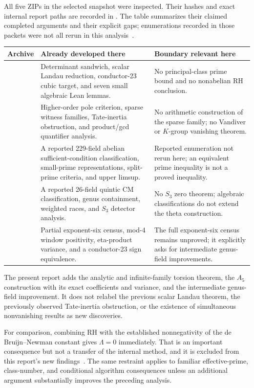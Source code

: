 All five ZIPs in the selected  snapshot were inspected.
Their hashes and exact internal report paths are recorded in
. The table summarizes their
claimed completed arguments and their explicit gaps; enumerations
recorded in those packets were not all rerun in this analysis~\cite{prior}.

\begin{center}
\footnotesize
\begin{tabularx}{\textwidth}{@{}p{49mm}YY@{}}
\toprule
Archive & Already developed there & Boundary relevant here\\
\midrule
{} &
Determinant sandwich, scalar Landau reduction, conductor-23 cubic target,
and seven small algebraic Lean lemmas. &
No principal-class prime bound and no nonabelian RH conclusion.\\
\addlinespace
{} &
Higher-order pole criterion, sparse witness families, Tate-inertia
obstruction, and product/gcd quantifier analysis. &
No arithmetic construction of the sparse family; no Vandiver or
\(K\)-group vanishing theorem.\\
\addlinespace
{} &
A reported 229-field abelian sufficient-condition classification,
small-prime representations, split-prime criteria, and upper limsup. &
Reported enumeration not rerun here; an equivalent prime inequality
is not a proved inequality.\\
\addlinespace
{} &
A reported 26-field quintic CM classification, genus containment,
weighted races, and \(S_3\) detector analysis. &
No \(S_3\) zero theorem; algebraic classifications do not extend the
theta construction.\\
\addlinespace
{} &
Partial exponent-six census, mod-4 window positivity, eta-product
variance, and a conductor-23 sign equivalence. &
The full exponent-six census remains unproved; it explicitly asks for
intermediate genus-field improvements.\\
\bottomrule
\end{tabularx}
\end{center}

The present report adds the analytic and infinite-family torsion theorem,
the \(A_5\) construction with its exact coefficients and variance, and the
intermediate genus-field improvement. It does not relabel the previous
scalar Landau theorem, the previously observed Tate-inertia obstruction,
or the existence of simultaneous nonvanishing results as new discoveries.

For comparison, combining RH with the established nonnegativity of the
de Bruijn--Newman constant gives \(\Lambda=0\) immediately. That is an
important consequence but not a transfer of the internal method, and it
is excluded from this report's new findings~\cite{rodgers-tao}.
The same restraint applies to familiar effective-prime, class-number,
and conditional algorithm consequences unless an additional argument
substantially improves the preceding analysis.


